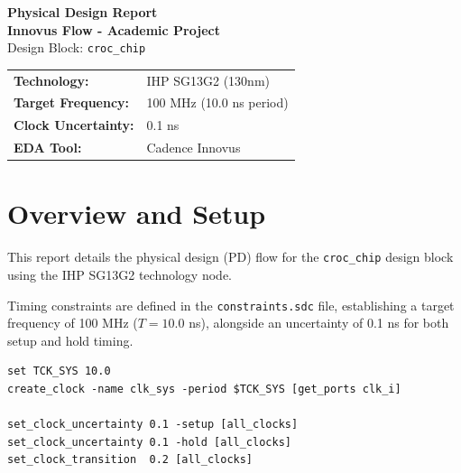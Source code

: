 \documentclass[12pt,a4paper]{article}
\begin{document}
\begin{titlepage}
\centering
\vspace*{2cm}
{\Huge\bfseries Physical Design Report\\[0.3cm]}
{\Huge\bfseries Innovus Flow - Academic Project\\[0.5cm]}
{\Large Design Block: \texttt{croc\_chip}}\\[1cm]

\vspace{1cm}
{\large
\begin{tabular}{ll}
\textbf{Technology:} & IHP SG13G2 (130nm) \\
\textbf{Target Frequency:} & 100 MHz (10.0 ns period) \\
\textbf{Clock Uncertainty:} & 0.1 ns \\
\textbf{EDA Tool:} & Cadence Innovus \\
\end{tabular}
}

\vspace{2cm}
\vfill
\end{titlepage}

\tableofcontents
\newpage

\section{Overview and Setup}
This report details the physical design (PD) flow for the \texttt{croc\_chip} design block using the IHP SG13G2 technology node.

Timing constraints are defined in the \texttt{constraints.sdc} file, establishing a target frequency of 100 MHz ($T = 10.0$ ns), alongside an uncertainty of 0.1 ns for both setup and hold timing.

\begin{lstlisting}[caption={Timing constraints}]
set TCK_SYS 10.0
create_clock -name clk_sys -period $TCK_SYS [get_ports clk_i]

set_clock_uncertainty 0.1 -setup [all_clocks]
set_clock_uncertainty 0.1 -hold [all_clocks]
set_clock_transition  0.2 [all_clocks]
\end{lstlisting}

\end{document}
